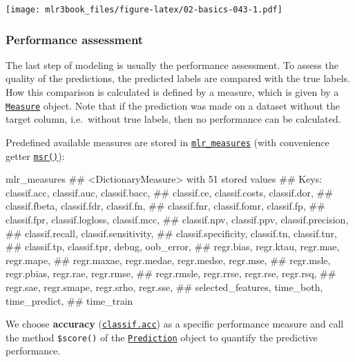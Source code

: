 \documentclass[]{article}
\newenvironment{Shaded}{}{}
\newcommand{\NormalTok}[1]{#1}
\renewenvironment{Shaded} {\begin{snugshade}\small} {\end{snugshade}}
\begin{document}
\texttt{[image: mlr3book\_files/figure-latex/02-basics-043-1.pdf]}

\hypertarget{measure}{%
\subsubsection{Performance assessment}\label{measure}}

The last step of modeling is usually the performance assessment.
To assess the quality of the predictions, the predicted labels are compared with the true labels.
How this comparison is calculated is defined by a measure, which is given by a \href{https://mlr3.mlr-org.com/reference/Measure.html}{\texttt{Measure}} object.
Note that if the prediction was made on a dataset without the target column, i.e.~without true labels, then no performance can be calculated.

Predefined available measures are stored in \href{https://mlr3.mlr-org.com/reference/mlr_measures.html}{\texttt{mlr\_measures}} (with convenience getter \href{https://mlr3.mlr-org.com/reference/mlr_sugar.html}{\texttt{msr()}}):

\begin{Shaded}
\begin{Highlighting}[]
\NormalTok{mlr_measures}
\NormalTok{## <DictionaryMeasure> with 51 stored values}
\NormalTok{## Keys: classif.acc, classif.auc, classif.bacc,}
\NormalTok{##   classif.ce, classif.costs, classif.dor,}
\NormalTok{##   classif.fbeta, classif.fdr, classif.fn,}
\NormalTok{##   classif.fnr, classif.fomr, classif.fp,}
\NormalTok{##   classif.fpr, classif.logloss, classif.mcc,}
\NormalTok{##   classif.npv, classif.ppv, classif.precision,}
\NormalTok{##   classif.recall, classif.sensitivity,}
\NormalTok{##   classif.specificity, classif.tn, classif.tnr,}
\NormalTok{##   classif.tp, classif.tpr, debug, oob_error,}
\NormalTok{##   regr.bias, regr.ktau, regr.mae, regr.mape,}
\NormalTok{##   regr.maxae, regr.medae, regr.medse, regr.mse,}
\NormalTok{##   regr.msle, regr.pbias, regr.rae, regr.rmse,}
\NormalTok{##   regr.rmsle, regr.rrse, regr.rse, regr.rsq,}
\NormalTok{##   regr.sae, regr.smape, regr.srho, regr.sse,}
\NormalTok{##   selected_features, time_both, time_predict,}
\NormalTok{##   time_train}
\end{Highlighting}
\end{Shaded}

We choose \textbf{accuracy} (\href{https://mlr3.mlr-org.com/reference/mlr_measures_classif.acc.html}{\texttt{classif.acc}}) as a specific performance measure and call the method \texttt{\$score()} of the \href{https://mlr3.mlr-org.com/reference/Prediction.html}{\texttt{Prediction}} object to quantify the predictive performance.
\end{document}
